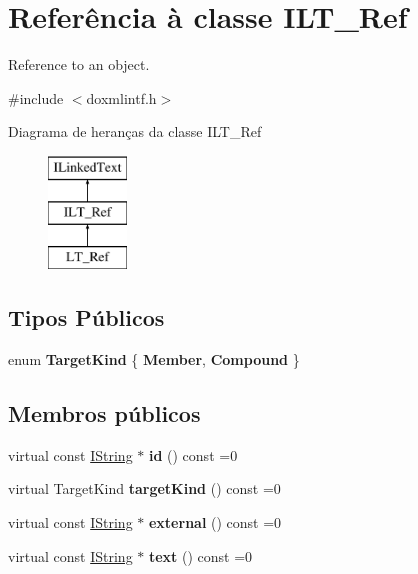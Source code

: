 \hypertarget{class_i_l_t___ref}{\section{Referência à classe I\-L\-T\-\_\-\-Ref}
\label{class_i_l_t___ref}
}


Reference to an object.  




{\ttfamily \#include $<$doxmlintf.\-h$>$}

Diagrama de heranças da classe I\-L\-T\-\_\-\-Ref\begin{figure}[H]
\begin{center}
\leavevmode
\includegraphics[height=3.000000cm]{class_i_l_t___ref}
\end{center}
\end{figure}
\subsection*{Tipos Públicos}
\begin{DoxyCompactItemize}
\item 
enum {\bfseries Target\-Kind} \{ {\bfseries Member}, 
{\bfseries Compound}
 \}
\end{DoxyCompactItemize}
\subsection*{Membros públicos}
\begin{DoxyCompactItemize}
\item 
\hypertarget{class_i_l_t___ref_aaba28daa272dce8bc14dde330d5b0126}{virtual const \hyperlink{class_i_string}{I\-String} $\ast$ {\bfseries id} () const =0}\label{class_i_l_t___ref_aaba28daa272dce8bc14dde330d5b0126}

\item 
\hypertarget{class_i_l_t___ref_a314ccf3219b104bf5e61b8387f936ab2}{virtual Target\-Kind {\bfseries target\-Kind} () const =0}\label{class_i_l_t___ref_a314ccf3219b104bf5e61b8387f936ab2}

\item 
\hypertarget{class_i_l_t___ref_ae2c03b2601e3685813ab583bd9bf1057}{virtual const \hyperlink{class_i_string}{I\-String} $\ast$ {\bfseries external} () const =0}\label{class_i_l_t___ref_ae2c03b2601e3685813ab583bd9bf1057}

\item 
\hypertarget{class_i_l_t___ref_aa487ae4b2bd6e3e7975ff2efe2666148}{virtual const \hyperlink{class_i_string}{I\-String} $\ast$ {\bfseries text} () const =0}\label{class_i_l_t___ref_aa487ae4b2bd6e3e7975ff2efe2666148}

\end{DoxyCompactItemize}


